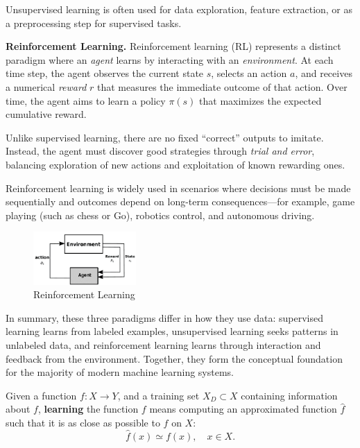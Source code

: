 \documentclass[10pt, letterpaper]{report}
\begin{document}
Unsupervised learning is often used for data exploration, feature extraction, or as a preprocessing step for supervised tasks.

\bigskip
\textbf{Reinforcement Learning.}
Reinforcement learning (RL) represents a distinct paradigm where an \emph{agent} learns by interacting with an \emph{environment}.
At each time step, the agent observes the current state $s$, selects an action $a$, and receives a numerical \emph{reward} $r$ that measures the immediate outcome of that action.
Over time, the agent aims to learn a policy $\pi(s)$ that maximizes the expected cumulative reward.

Unlike supervised learning, there are no fixed ``correct'' outputs to imitate.
Instead, the agent must discover good strategies through \emph{trial and error}, balancing exploration of new actions and exploitation of known rewarding ones.

Reinforcement learning is widely used in scenarios where decisions must be made sequentially and outcomes depend on long-term consequences—for example, game playing (such as chess or Go), robotics control, and autonomous driving.

\bigskip
\begin{figure}[h!]
	\centering
	\includegraphics[width=0.35\textwidth]{images/RL_diagram.png}
	\caption{Reinforcement Learning}
	\label{img:ReinforcementLearning}
\end{figure}

\bigskip
In summary, these three paradigms differ in how they use data:
supervised learning learns from labeled examples, unsupervised learning seeks patterns in unlabeled data, and reinforcement learning learns through interaction and feedback from the environment.
Together, they form the conceptual foundation for the majority of modern machine learning systems.

\begin{definition}
	Given a function $f: X \rightarrow Y$, and a training set $X_D \subset X$ containing information about $f$, \textbf{learning} the function $f$ means computing an approximated function $\hat f$ such that it is as close as possible to $f$ on $X$:
	\begin{equation}
		\hat f(x) \simeq f(x), \quad x \in X.
	\end{equation}
\end{definition}
\end{document}
